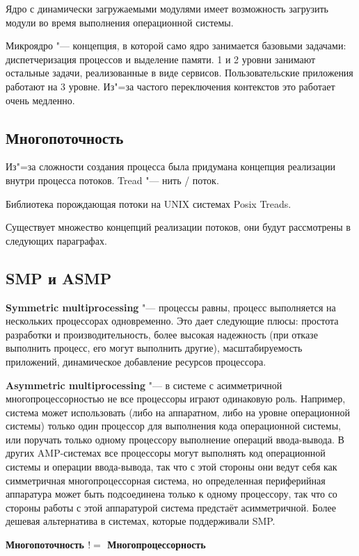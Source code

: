 \documentclass[bachelor, och, book]{SCWorks}
\theoremstyle{remark}
\begin{document}
    Ядро с динамически загружаемыми модулями имеет возможность загрузить модули во время выполнения операционной системы.
    
    Микроядро "--- концепция, в которой само ядро занимается базовыми задачами: диспетчеризация процессов и выделение памяти. 1 и 2 уровни занимают остальные задачи, реализованные в виде сервисов. Пользовательские приложения работают на 3 уровне. Из"=за частого переключения контекстов это работает очень медленно. 

    \subsection{Многопоточность}
    Из"=за сложности создания процесса была придумана концепция реализации внутри процесса потоков. Tread "--- нить / поток.

    Библиотека порождающая потоки на UNIX системах Posix Treads.
    
    Существует множество концепций реализации потоков, они будут рассмотрены в следующих параграфах.

    \subsection{SMP и ASMP}
    
    \textbf{Symmetric multiprocessing} "--- процессы равны, процесс выполняется на нескольких процессорах одновременно. Это дает следующие плюсы: простота разработки и производительность, более высокая надежность (при отказе выполнить процесс, его могут выполнить другие), масштабируемость приложений, динамическое добавление ресурсов процессора. 

    \textbf{Asymmetric multiprocessing} "--- в системе с асимметричной многопроцессорностью не все процессоры играют одинаковую роль. Например, система может использовать (либо на аппаратном, либо на уровне операционной системы) только один процессор для выполнения кода операционной системы, или поручать только одному процессору выполнение операций ввода-вывода. В других AMP-системах все процессоры могут выполнять код операционной системы и операции ввода-вывода, так что с этой стороны они ведут себя как симметричная многопроцессорная система, но определенная периферийная аппаратура может быть подсоединена только к одному процессору, так что со стороны работы с этой аппаратурой система предстаёт асимметричной. Более дешевая альтернатива в системах, которые поддерживали SMP.
 
    \textbf{Многопоточность $!=$ Многопроцессорность}
\end{document}
